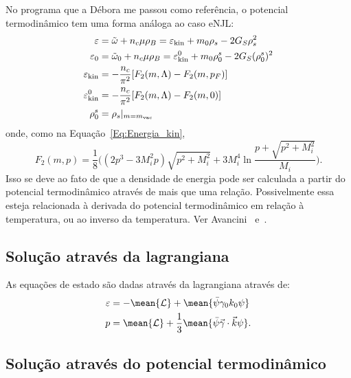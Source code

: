 No programa que a Débora me passou como referência, o potencial termodinâmico tem uma forma análoga ao caso eNJL:
\begin{subequations}\label{Eq:Pot_termodinamico_2}
\begin{align}
	\varepsilon &= \tilde{\omega} + n_c\mu\rho_B = \varepsilon_{\rm{kin}} + m_0\rho_s - 2G_S\rho_s^2 \\
	\varepsilon_0 &= \tilde{\omega}_0 + n_c\mu\rho_B = \varepsilon_{\rm{kin}}^0 + m_0\rho_0^s - 2G_S(\rho_0^s)^2 \\
	\varepsilon_{\rm{kin}} &= -\frac{n_c}{\pi^2} [F_2(m, \Lambda) - F_2(m, p_F)] \\
	\varepsilon_{\rm{kin}}^0 &= -\frac{n_c}{\pi^2} [F_2(m, \Lambda) - F_2(m, 0)] \\
	\rho_0^s &= \rho_s|_{m = m_{\rm{vac}}}
\end{align}
\end{subequations}
%
onde, como na Equação~\eqref{Eq:Energia_kin},
\begin{equation}
	F_2(m, p) = \frac{1}{8}\Big((2p^3 - 3M_i^2p)\sqrt{p^2 + M_i^2} + 3M_i^4\ln\frac{p + \sqrt{p^2 + M_i^2}}{M_i}\Big).
\end{equation}
%
Isso se deve ao fato de que a densidade de energia pode ser calculada a partir do potencial termodinâmico através de mais que uma relação. Possivelmente essa esteja relacionada à derivada do potencial termodinâmico em relação à temperatura, ou ao inverso da temperatura. Ver Avancini~\cite{Avancini2004} e~\cite{Avancini2006}.

\subsection{Solução através da lagrangiana}

As equações de estado são dadas através da lagrangiana através de\cite{Glendenning1983}:
\begin{align}
	\varepsilon &= -\mean{\mathcal{L}} + \mean{\bar\psi\gamma_0k_0\psi} \\
	p &= \mean{\mathcal{L}} + \frac{1}{3} \mean{\bar\psi\vec{\gamma}\cdot\vec{k}\psi}.
\end{align}

\subsection{Solução através do potencial termodinâmico}

